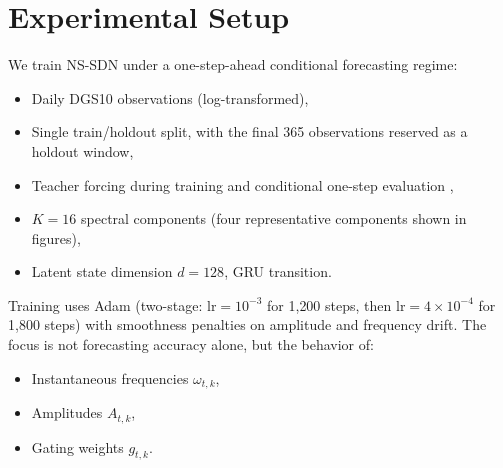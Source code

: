 \section{Experimental Setup}
We train NS-SDN under a one-step-ahead conditional forecasting regime:
\begin{itemize}
\item Daily DGS10 observations (log-transformed),
\item Single train/holdout split, with the final 365 observations reserved as a holdout window,
\item Teacher forcing during training and conditional one-step evaluation \cite{flunkertdeepar},
\item $K=16$ spectral components (four representative components shown in figures),
\item Latent state dimension $d = 128$, GRU transition.
\end{itemize}
Training uses Adam \cite{adamoptim} (two-stage: $\mathrm{lr}=10^{-3}$ for 1{,}200 steps, then $\mathrm{lr}=4\!\times\!10^{-4}$ for 1{,}800 steps) with smoothness penalties on amplitude and frequency drift. The focus is not forecasting accuracy alone, but the behavior of:
\begin{itemize}
\item Instantaneous frequencies $\omega_{t,k}$,
\item Amplitudes $A_{t,k}$,
\item Gating weights $g_{t,k}$.
\end{itemize}
